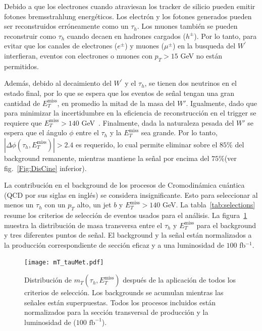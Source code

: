 Debido a que los electrones cuando atraviesan los tracker de silicio pueden emitir fotones bremsstrahlung energéticos. Los electrón y los fotones generados pueden ser reconstruidos erróneamente como un $\tau_h$. Los muones también se pueden reconstruir como $\tau_h$ cuando decaen en hadrones cargados ($h^{\pm}$). Por lo tanto, para evitar que los canales de electrones ($e^{\pm}$) y muones ($\mu^{\pm}$) en la busqueda del $W^{\prime}$ interfieran, eventos con electrones o muones con $p_T > 15$ GeV no están permitidos. 

Además, debido al decaimiento del $W^{\prime}$ y el $\tau_h$, se tienen dos neutrinos en el estado final, por lo que se espera que los eventos de señal tengan una gran cantidad de $E^{\text{miss}}_T$, en promedio la mitad de la masa del $W'$. Igualmente, dado que para minimizar la incertidumbre en la eficiencia de reconstrucción en el trigger se requiere que $E^{\text{miss}}_{T} > 140$ GeV~\cite{Padeken:2265826}. Finalmente, dada la naturaleza pesada del $W'$ se espera que el ángulo $\phi$ entre el $\tau_h$ y la $E^{\text{miss}}_T$ sea grande. Por lo tanto, $|\Delta \phi (\tau_h, E^{\text{miss}}_T)| > 2.4$ es requerido, lo cual permite eliminar sobre el $85\%$ del background remanente, mientras mantiene la señal por encima del $75\%$(ver fig.~\ref{Fig:DisCine} inferior).

La contribución en el background de los procesos de Cromodinámica cuántica (QCD por sus siglas en inglés) se considera insignificante. Esto para seleccionar al menos un $\tau_h$ con un $p_T$ alto, un jet $b$ y $E^{\text{miss}}_T > 140$ GeV. La tabla~\ref{tab:selections} resume los criterios de selección de eventos usados para el análisis. La figura~\ref{Fig:mTstacked} muestra la distribución de masa transversa entre el $\tau_h$ y $E^{\text{miss}}_T$ para el background y tres diferentes puntos de señal. El background y la señal están normalizados a la producción correspondiente de sección eficaz y a una luminosidad de $100$ fb$^{-1}$.

%
 \begin{figure}
 \begin{center} 
 \texttt{[image: mT\_tauMet.pdf]}
 \end{center}
 \caption{Distribución de $m_{T}(\tau_{h},E^{\text{miss}}_{T})$ después de la aplicación de todos los criterios de selección. Los backgrounds se acumulan mientras las señales están superpuestas. Todos los procesos incluidos están normalizados para la sección transversal de producción y la luminosidad de ($100\text{ fb}^{-1}$).}
 \label{Fig:mTstacked}
 \end{figure} 
%

